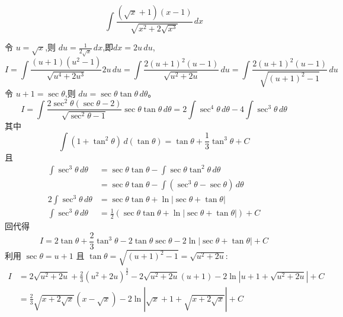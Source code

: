 \begin{questions}
    \question
    \[
    \int \frac{(\sqrt{x}+1)(x-1)}{\sqrt{x^2+2\sqrt{x^3}}} \, dx
    \]
    \begin{solution}
        令 $u = \sqrt{x}$,则 $du = \frac{1}{2\sqrt{x}} \, dx$,即$dx = 2u \, du$,
        \[
        I = \int \frac{(u+1)(u^2-1)}{\sqrt{u^4+2u^3}} 2u \, du = \int \frac{2(u+1)^2(u-1)}{\sqrt{u^2+2u}} \, du = \int \frac{2(u+1)^2(u-1)}{\sqrt{(u+1)^2-1}} \, du
        \]
        令 $u+1 = \sec\theta$,则 $du = \sec\theta \tan\theta \, d\theta$。
        \[
        I=\int \frac{2\sec^2\theta(\sec\theta-2)}{\sqrt{\sec^2\theta-1}} \sec\theta \tan\theta \, d\theta 
        = 2 \int \sec^4\theta \, d\theta - 4 \int \sec^3\theta \, d\theta
        \]
        其中
        \[
        \int (1+\tan^2\theta) \, d(\tan\theta) = \tan\theta + \frac{1}{3}\tan^3\theta + C
        \]
        且
        \begin{align*}
        \int \sec^3 \theta \,d\theta &= \sec \theta \tan \theta - \int \sec \theta \tan^2 \theta \,d\theta \\
        &= \sec \theta \tan \theta - \int (\sec^3 \theta - \sec \theta) \,d\theta \\
        2 \int \sec^3 \theta \,d\theta &= \sec \theta \tan \theta + \ln |\sec \theta + \tan \theta| \\
        \int \sec^3 \theta \,d\theta &= \frac{1}{2} (\sec \theta \tan \theta + \ln |\sec \theta + \tan \theta|) + C
        \end{align*}
        回代得
        \[
        I= 2\tan\theta + \frac{2}{3}\tan^3\theta - 2\tan\theta\sec\theta - 2\ln|\sec\theta + \tan\theta| + C
        \]
        利用 $\sec\theta = u+1$ 且 $\tan\theta = \sqrt{(u+1)^2-1} = \sqrt{u^2+2u}$:
        \begin{align*}
        I &= 2\sqrt{u^2+2u} + \frac{2}{3}(u^2+2u)^{\frac{3}{2}} - 2\sqrt{u^2+2u}(u+1) - 2\ln|u+1+\sqrt{u^2+2u}| + C \\
        &= \frac{2}{3}\sqrt{x+2\sqrt{x}}(x-\sqrt{x}) - 2\ln|\sqrt{x}+1+\sqrt{x+2\sqrt{x}}| + C
        \end{align*}
    \end{solution}


\end{questions}
